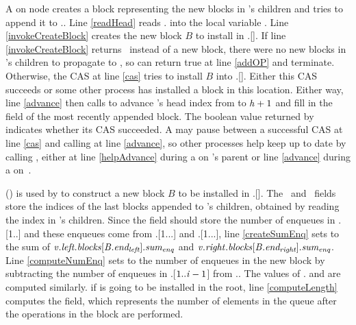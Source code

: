 A  on node  creates a block representing the new blocks
in 's
children and tries to append it to .. 
Line \ref{readHead} reads . into the local variable .
Line \ref{invokeCreateBlock} creates the new block $B$ to install in .[].
If line \ref{invokeCreateBlock} returns \nl\ instead of a new block, there were no new blocks in 's children to propagate to , so  can return true at line \ref{addOP} and terminate.
Otherwise, the CAS at line \ref{cas} tries to install $B$ into .[].
Either this CAS succeeds or some other process has installed a  block in this location.
Either way, line \ref{advance} then calls  to advance 's head index 
from  to $\mbox{\textnormal{\textit{h}}}+1$
and fill in the  field of the most recently appended block.
The boolean value returned by  indicates whether its CAS succeeded.
A  may pause between a successful CAS at line \ref{cas} and calling  at line \ref{advance},
so other processes help keep  up to date by  calling , 
either at line \ref{helpAdvance} during a  on 's parent or line \ref{advance} during a  on~.

() is used
by  to construct a new block $B$ to be installed in .[].
The \eleft\ and \eright\ fields store the indices of the last blocks appended to 's
children, obtained by reading the  index in 's children.
Since the  field should store the number of enqueues in
.[1..] and these enqueues come from .[1...\eleft] and .[1...\eright], line \ref{createSumEnq} sets
 to the sum of $\mbox{\textnormal{\textit{v}}}.\mbox{\textit{left.blocks}}[\mbox{\textnormal{\textit{B}}}.\mbox{\textit{end\textsubscript{left}}}].\mbox{\textit{sum\textsubscript{enq}}}$ and $\mbox{\textnormal{\textit{v}}}.\mbox{\textit{right}}.\mbox{\textit{blocks}}[\mbox{\textnormal{\textit{B}}}.\mbox{\textit{end\textsubscript{right}}}].\mbox{\textit{sum\textsubscript{enq}}}$.
Line \ref{computeNumEnq} sets  to the number of enqueues in the new block by
subtracting  the number of enqueues  in .[$1..\mbox{\textnormal{\textit{i}}}-1$] from ..
The values of . and  are computed similarly.
 if 
is going to be installed in the root, line \ref{computeLength} computes the  field, which
represents the number of elements in the queue after the operations in the block are performed.

